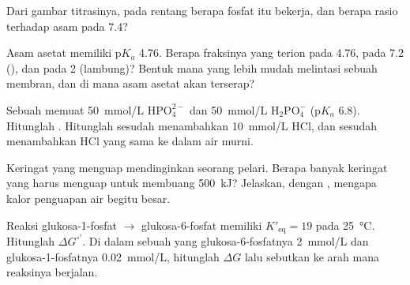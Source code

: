 \begin{exercise}[$\star$]\label{exo:b1:water-small-molecules:4}
Dari gambar titrasinya, pada rentang  berapa  fosfat itu
bekerja, dan berapa rasio  terhadap asam pada  7.4?
\end{exercise}

\begin{exercise}[$\star\star$]\label{exo:b1:water-small-molecules:5}
Asam asetat memiliki p$K_a$ 4.76. Berapa fraksinya yang terion pada 
4.76, pada  7.2 (), dan pada  2 (lambung)? Bentuk mana yang
lebih mudah melintasi sebuah membran, dan di mana asam asetat akan
terserap?
\end{exercise}

\begin{exercise}[$\star\star$]\label{exo:b1:water-small-molecules:6}
Sebuah  memuat \qty{50}{mmol/L} $\mathrm{HPO_4^{2-}}$ dan
\qty{50}{mmol/L} $\mathrm{H_2PO_4^-}$ (p$K_a$ 6.8). Hitunglah .
Hitunglah  sesudah menambahkan \qty{10}{mmol/L} HCl, dan sesudah
menambahkan HCl yang sama ke dalam air murni.
\end{exercise}

\begin{exercise}[$\star\star$]\label{exo:b1:water-small-molecules:7}
Keringat yang menguap mendinginkan seorang pelari. Berapa banyak
keringat yang harus menguap untuk membuang \qty{500}{kJ}? Jelaskan,
dengan , mengapa kalor penguapan air begitu besar.
\end{exercise}

\begin{exercise}[$\star\star$]\label{exo:b1:water-small-molecules:8}
Reaksi glukosa-1-fosfat $\to$ glukosa-6-fosfat memiliki
$K'_{\text{eq}} = 19$ pada \qty{25}{\celsius}. Hitunglah
$\Delta G^{\circ\prime}$. Di dalam sebuah  yang glukosa-6-fosfatnya
\qty{2}{mmol/L} dan glukosa-1-fosfatnya \qty{0.02}{mmol/L}, hitunglah
$\Delta G$ lalu sebutkan ke arah mana reaksinya berjalan.
\end{exercise}

